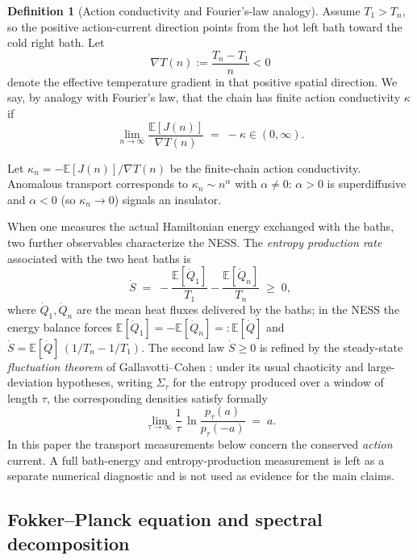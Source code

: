 \documentclass[11pt,a4paper]{article}
\theoremstyle{definition}
\newtheorem{definition}[theorem]{Definition}
\newcommand{\E}{\mathbb{E}}
\numberwithin{equation}{section}   %
\begin{document}
\begin{definition}[Action conductivity and Fourier's-law analogy]\label{de:fourier}
Assume $T_1>T_n$, so the positive action-current direction points from the hot
left bath toward the cold right bath. Let
\[
  \nabla T(n):=\frac{T_n-T_1}{n}<0
\]
denote the effective temperature gradient in that positive spatial direction.
We say, by analogy with Fourier's law, that the chain has finite action
conductivity $\kappa$ if
\begin{equation}\label{eq:fourier}
  \lim_{n \rightarrow \infty}\frac{\E[J(n)]}{\nabla T(n)} \;=\; -
  \kappa \in (0,\infty).
\end{equation}

Let $\kappa_n = -\E[J(n)]/\nabla T(n)$ be the finite-chain action
conductivity. Anomalous transport corresponds to $\kappa_n\sim n^{\alpha}$ with
$\alpha\neq0$:
$\alpha>0$ is superdiffusive and $\alpha<0$ (so $\kappa_n\to0$) signals an
insulator.
\end{definition}

When one measures the actual Hamiltonian energy exchanged with the baths, two
further observables characterize the NESS. The \emph{entropy production rate}
associated with the two heat baths is
\begin{equation}\label{eq:entropy-prod}
  \dot S \;=\; -\frac{\E[\dot Q_1]}{T_1} - \frac{\E[\dot Q_n]}{T_n} \;\ge\; 0,
\end{equation}
where $\dot Q_1,\dot Q_n$ are the mean heat fluxes delivered by the baths; in
the NESS the energy balance forces $\E[\dot Q_1]=-\E[\dot Q_n]=:\E[\dot Q]$ and
$\dot S = \E[\dot Q]\,(1/T_n - 1/T_1)$. The second law $\dot S\ge 0$ is refined
by the steady-state \emph{fluctuation theorem} of Gallavotti--Cohen
\cite{GallavottiCohen}: under its usual chaoticity and large-deviation
hypotheses, writing $\Sigma_\tau$ for the entropy produced over a window of
length $\tau$, the corresponding densities satisfy formally
\begin{equation}\label{eq:ft}
  \lim_{\tau\to\infty}\frac{1}{\tau}\,
  \ln\frac{p_\tau(a)}{p_\tau(-a)} \;=\; a .
\end{equation}
In this paper the transport measurements below concern the conserved
\emph{action} current. A full bath-energy and entropy-production measurement is
left as a separate numerical diagnostic and is not used as evidence for the
main claims.

\subsection{Fokker--Planck equation and spectral decomposition}\label{sec:fp}
\end{document}
